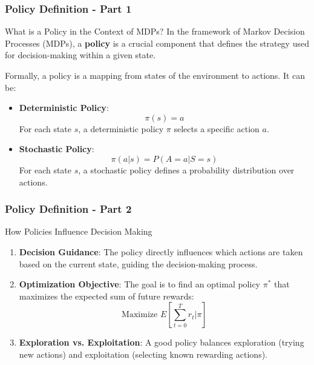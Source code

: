 \documentclass[aspectratio=169]{beamer}
\begin{document}
\begin{frame}[fragile]
    \frametitle{Policy Definition - Part 1}
    \begin{block}{What is a Policy in the Context of MDPs?}
        In the framework of Markov Decision Processes (MDPs), a \textbf{policy} is a crucial component that defines the strategy used for decision-making within a given state.
    \end{block}
    
    Formally, a policy is a mapping from states of the environment to actions. It can be:
    
    \begin{itemize}
        \item \textbf{Deterministic Policy}:
            \[
            \pi(s) = a
            \]
            For each state \( s \), a deterministic policy \( \pi \) selects a specific action \( a \).
        
        \item \textbf{Stochastic Policy}:
            \[
            \pi(a|s) = P(A = a | S = s)
            \]
            For each state \( s \), a stochastic policy defines a probability distribution over actions.
    \end{itemize}
\end{frame}

\begin{frame}[fragile]
    \frametitle{Policy Definition - Part 2}
    \begin{block}{How Policies Influence Decision Making}
        \begin{enumerate}
            \item \textbf{Decision Guidance}:
                  The policy directly influences which actions are taken based on the current state, guiding the decision-making process.
                  
            \item \textbf{Optimization Objective}:
                  The goal is to find an optimal policy \( \pi^* \) that maximizes the expected sum of future rewards:
                  \[
                  \text{Maximize } E\left[\sum_{t=0}^{T} r_t | \pi\right]
                  \]
                  
            \item \textbf{Exploration vs. Exploitation}:
                  A good policy balances exploration (trying new actions) and exploitation (selecting known rewarding actions).
        \end{enumerate}
    \end{block}
\end{frame}
\end{document}
